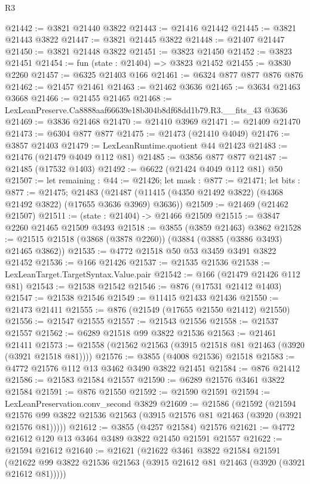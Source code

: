 \begin{lexlean}{R3}
\begin{coremodule}
@21442 := @3821 @21440 @3822
@21443 := @21416 @21442
@21445 := @3821 @21443 @3822
@21447 := @3821 @21445 @3822
@21448 := @21407 @21447
@21450 := @3821 @21448 @3822
@21451 := @3823 @21450
@21452 := @3823 @21451
@21454 := fun (state : @21404) => @3823 @21452
@21455 := @3830 @2260
@21457 := @6325 @21403 @166
@21461 := @6324 @877 @877 @876 @876
@21462 := @21457 @21461
@21463 := @21462 @3636
@21465 := @3634 @21463 @3668
@21466 := @21455 @21465
@21468 := LexLeanPreserve.Ca8888aaf66639e18b304b8df68dd1b79.R3.__fits_43 @3636
@21469 := @3836 @21468
@21470 := @21410 @3969
@21471 := @21409 @21470
@21473 := @6304 @877 @877
@21475 := @21473 (@21410 @4049)
@21476 := @3857 @21403
@21479 := LexLeanRuntime.quotient @44 @21423
@21483 := @21476 (@21479 @4049 @112 @81)
@21485 := @3856 @877 @877
@21487 := @21485 (@17532 @1403)
@21492 := @6622 (@21424 @4049 @112 @81) @50
@21507 := let remaining : @44 := @21426;
  let mask : @877 := @21471;
  let bits : @877 := @21475;
  @21483 (@21487 (@11415 (@4350 @21492 @3822) (@4368 @21492 @3822) (@17655 @3636 @3969) @3636))
@21509 := @21469 (@21462 @21507)
@21511 := (state : @21404) -> @21466 @21509
@21515 := @3847 @2260 @21465 @21509 @3493
@21518 := @3855 (@3859 @21463) @3862
@21528 := @21515 @21518 (@3868 (@3878 @2260)) (@3884 (@3885 (@3886 @3493) @21465 @3862))
@21535 := @4772 @21518 @50 @53 @3459 @3491 @3822 @21452
@21536 := @166 @21426
@21537 := @21535 @21536
@21538 := LexLeanTarget.TargetSyntax.Value.pair
@21542 := @166 (@21479 @21426 @112 @81)
@21543 := @21538 @21542
@21546 := @876 (@17531 @21412 @1403)
@21547 := @21538 @21546
@21549 := @11415 @21433 @21436
@21550 := @21473 @21411
@21555 := @876 (@21549 (@17655 @21550 @21412) @21550)
@21556 := @21547 @21555
@21557 := @21543 @21556
@21558 := @21537 @21557
@21562 := @6289 @21518 @99 @3822 @21536
@21563 := @21461 @21411
@21573 := @21558 (@21562 @21563 (@3915 @21518 @81 @21463 (@3920 (@3921 @21518 @81))))
@21576 := @3855 (@4008 @21536) @21518
@21583 := @4772 @21576 @112 @13 @3462 @3490 @3822 @21451
@21584 := @876 @21412
@21586 := @21583 @21584 @21557
@21590 := @6289 @21576 @3461 @3822 @21584
@21591 := @876 @21550
@21592 := @21590 @21591
@21594 := LexLeanPreservation.conv_second @3829
@21609 := @21586
    (@21592
      (@21594 @21576 @99 @3822 @21536 @21563 (@3915 @21576 @81 @21463 (@3920 (@3921 @21576 @81)))))
@21612 := @3855 (@4257 @21584) @21576
@21621 := @4772 @21612 @120 @13 @3464 @3489 @3822 @21450 @21591 @21557
@21622 := @21594 @21612
@21640 := @21621
    (@21622
      @3461
      @3822
      @21584
      @21591
      (@21622 @99 @3822 @21536 @21563 (@3915 @21612 @81 @21463 (@3920 (@3921 @21612 @81)))))

\end{coremodule}
\end{lexlean}
